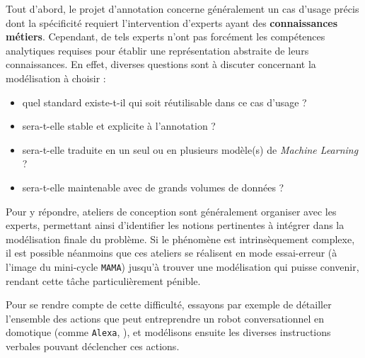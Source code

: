 			Tout d'abord, le projet d'annotation concerne généralement un cas d'usage précis dont la spécificité requiert l'intervention d'experts ayant des \textbf{connaissances métiers}.
			Cependant, de tels experts n'ont pas forcément les compétences analytiques requises pour établir une représentation abstraite de leurs connaissances.
			En effet, diverses questions sont à discuter concernant la modélisation à choisir :
			\begin{itemize}
				\item quel standard existe-t-il qui soit réutilisable dans ce cas d'usage ?
				\item sera-t-elle stable et explicite à l'annotation ?
				\item sera-t-elle traduite en un seul ou en plusieurs modèle(s) de \textit{Machine Learning} ?
				\item sera-t-elle maintenable avec de grands volumes de données ?
			\end{itemize}
			Pour y répondre, ateliers de conception sont généralement organiser avec les experts, permettant ainsi d'identifier les notions pertinentes à intégrer dans la modélisation finale du problème.
			Si le phénomène est intrinsèquement complexe, il est possible néanmoins que ces ateliers se réalisent en mode essai-erreur (à l'image du mini-cycle \texttt{MAMA}) jusqu'à trouver une modélisation qui puisse convenir, rendant cette tâche particulièrement pénible.
			\begin{leftBarExamples}
				Pour se rendre compte de cette difficulté, essayons par exemple de détailler l'ensemble des actions que peut entreprendre un robot conversationnel en domotique (comme \texttt{Alexa}, \cite{alexa-internet:2018:keyword-research-competitor}), et modélisons ensuite les diverses instructions verbales pouvant déclencher ces actions.
			\end{leftBarExamples}
			
